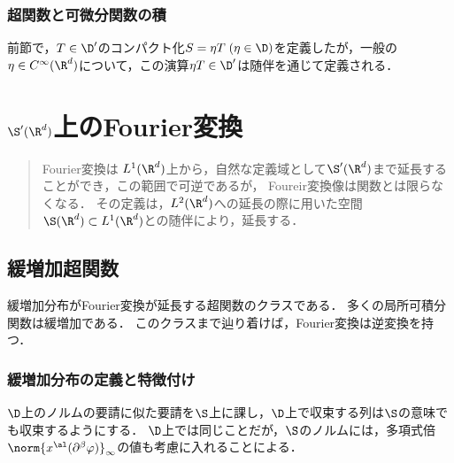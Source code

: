 \documentclass[uplatex,dvipdfmx]{jsreport}
\begin{document}
\subsection{超関数と可微分関数の積}

\begin{tcolorbox}[colframe=ForestGreen, colback=ForestGreen!10!white,breakable,colbacktitle=ForestGreen!40!white,coltitle=black,fonttitle=\bfseries\sffamily,
title=]
    前節で，$T\in\D'$のコンパクト化$S=\eta T\;(\eta\in\D)$を定義したが，一般の$\eta\in C^\infty(\R^d)$について，この演算$\eta T\in\D'$は随伴を通じて定義される．
\end{tcolorbox}

\chapter{$\S'(\R^d)$上のFourier変換}

\begin{quotation}
    Fourier変換は
    $L^1(\R^d)$上から，自然な定義域として$\S'(\R^d)$まで延長することができ，この範囲で可逆であるが，
    Foureir変換像は関数とは限らなくなる．
    その定義は，$L^2(\R^d)$への延長の際に用いた空間$\S(\R^d)\subset L^1(\R^d)$との随伴により，延長する．
\end{quotation}

\section{緩増加超関数}

\begin{tcolorbox}[colframe=ForestGreen, colback=ForestGreen!10!white,breakable,colbacktitle=ForestGreen!40!white,coltitle=black,fonttitle=\bfseries\sffamily,
title=]
    緩増加分布がFourier変換が延長する超関数のクラスである．
    多くの局所可積分関数は緩増加である．
    このクラスまで辿り着けば，Fourier変換は逆変換を持つ．
\end{tcolorbox}

\subsection{緩増加分布の定義と特徴付け}

\begin{tcolorbox}[colframe=ForestGreen, colback=ForestGreen!10!white,breakable,colbacktitle=ForestGreen!40!white,coltitle=black,fonttitle=\bfseries\sffamily,
title=]
    $\D$上のノルムの要請に似た要請を$\S$上に課し，$\D$上で収束する列は$\S$の意味でも収束するようにする．
    $\D$上では同じことだが，$\S$のノルムには，多項式倍$\norm{x^\al(\partial^\beta\varphi)}_\infty$の値も考慮に入れることによる．
\end{tcolorbox}
\end{document}
